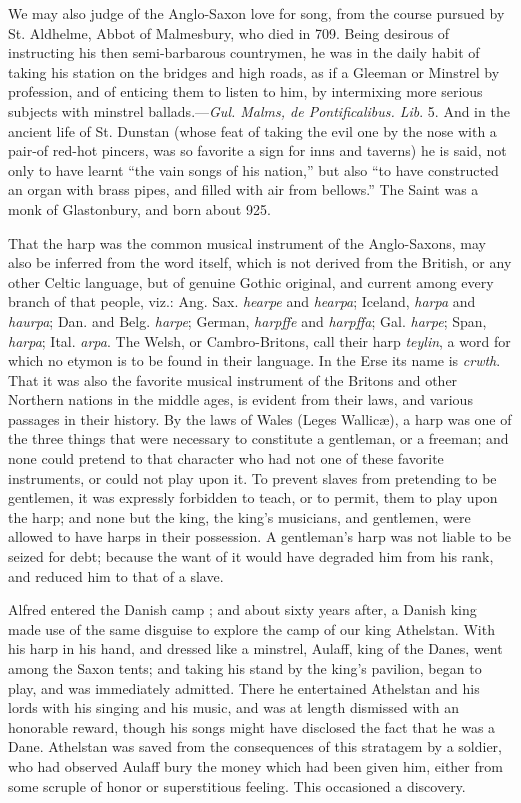 We may also judge of the Anglo-Saxon love for song, from the course pursued
by St. Aldhelme, Abbot of Malmesbury, who died in 709. Being desirous of
instructing his then semi-barbarous countrymen, he was in the daily habit of
taking his station on the bridges and high roads, as if a Gleeman or Minstrel
by profession, and of enticing them to listen to him, by intermixing more serious
subjects with minstrel ballads.—\textit{Gul. Malms, de Pontificalibus. Lib}. 5. And
in the ancient life of St. Dunstan (whose feat of taking the evil one by the nose
with a pair-of red-hot pincers, was so favorite a sign for inns and taverns) he is
said, not only to have learnt “the vain songs of his nation,” but also “to have
constructed an organ with brass pipes, and filled with air from bellows.”
The Saint was a monk of Glastonbury, and born about 925.

That the harp was the common musical instrument of the Anglo-Saxons, may
also be inferred from the word itself, which is not derived from the British, or 
any other Celtic language, but of genuine
\pagebreak
Gothic original, and current among
every branch of that people, viz.: Ang. Sax. \textit{hearpe} and \textit{hearpa}; Iceland, \textit{harpa} 
and \textit{haurpa}; Dan. and Belg. \textit{harpe}; German, \textit{harpffe} and \textit{harpffa}; Gal. \textit{harpe};
Span, \textit{harpa}; Ital. \textit{arpa}. The Welsh, or Cambro-Britons, call their harp \textit{teylin},
a word for which no etymon is to be found in their language. In the Erse its
name is \textit{crwth}. That it was also the favorite musical instrument of the Britons
and other Northern nations in the middle ages, is evident from their laws,
and various passages in their history. By the laws of Wales (Leges Wallicæ), a
harp was one of the three things that were necessary to constitute a gentleman,
or a freeman; and none could pretend to that character who had not one of these
favorite instruments, or could not play upon it. To prevent slaves from pretending
to be gentlemen, it was expressly forbidden to teach, or to permit, them
to play upon the harp; and none but the king, the king’s musicians, and
gentlemen, were allowed to have harps in their possession. A gentleman’s harp
was not liable to be seized for debt; because the want of it would have degraded
him from his rank, and reduced him to that of a slave.

Alfred entered the Danish camp ; and about sixty years after, a
Danish king made use of the same disguise to explore the camp of our king
Athelstan. With his harp in his hand, and dressed like a minstrel, Aulaff, king
of the Danes, went among the Saxon tents; and taking his stand by the king’s
pavilion, began to play, and was immediately admitted. There he entertained
Athelstan and his lords with his singing and his music, and was at length dismissed
with an honorable reward, though his songs might have disclosed the fact
that he was a Dane. Athelstan was saved from the consequences of this stratagem
by a soldier, who had observed Aulaff bury the money which had been given him,
either from some scruple of honor or superstitious feeling. This occasioned
a discovery.


